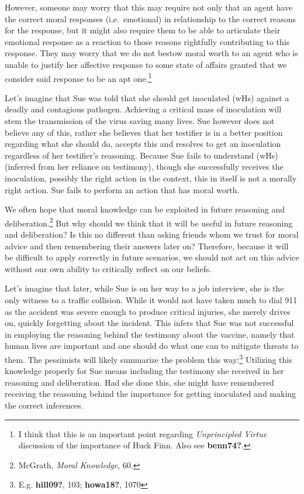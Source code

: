 \documentclass[
  12pt,
]{book}
\theoremstyle{definition}
\theoremstyle{definition}
\theoremstyle{definition}
\theoremstyle{definition}
\theoremstyle{remark}
\begin{document}
However, someone may worry that this may require not only that an agent have the correct moral responses (i.e.~emotional) in relationship to the correct reasons for the response, but it might also require them to be able to articulate their emotional response as a reaction to those reasons rightfully contributing to this response. They may worry that we do not bestow moral worth to an agent who is unable to justify her affective response to some state of affairs granted that we consider said response to be an apt one.\footnote{I think that this is an important point regarding \emph{Unprincipled {Virtue}} discussion of the importance of Huck Finn. Also see \textbf{benn74?}.}

Let's imagine that Sue was told that she should get inoculated (wHs) against a deadly and contagious pathogen. Achieving a critical mass of inoculation will stem the transmission of the virus saving many lives. Sue however does not believe any of this, rather she believes that her testifier is in a better position regarding what she should do, accepts this and resolves to get an inoculation regardless of her testifier's reasoning. Because Sue fails to understand (wHs) (inferred from her reliance on testimony), though she successfully receives the inoculation, possibly the right action in the context, this in itself is not a morally right action. Sue fails to perform an action that has moral worth.

We often hope that moral knowledge can be exploited in future reasoning and deliberation.\footnote{McGrath, \emph{Moral {Knowledge}}, 60.} But why should we think that it will be useful in future reasoning and deliberation? Is this no different than asking friends whom we trust for moral advice and then remembering their answers later on? Therefore, because it will be difficult to apply correctly in future scenarios, we should not act on this advice without our own ability to critically reflect on our beliefs.

Let's imagine that later, while Sue is on her way to a job interview, she is the only witness to a traffic collision. While it would not have taken much to dial 911 as the accident was severe enough to produce critical injuries, she merely drives on, quickly forgetting about the incident. This infers that Sue was not successful in employing the reasoning behind the testimony about the vaccine, namely that human lives are important and one should do what one can to mitigate threats to them. The pessimists will likely summarize the problem this way:\footnote{E.g. \textbf{hill09?}, 103; \textbf{howa18?}, 1070} Utilizing this knowledge properly for Sue means including the testimony she received in her reasoning and deliberation. Had she done this, she might have remembered receiving the reasoning behind the importance for getting inoculated and making the correct inferences.
\end{document}
